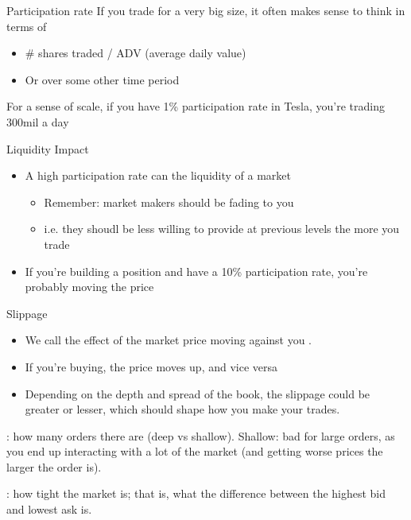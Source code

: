
Participation rate
If you trade for a very big size, it often makes sense to think in terms of 
\begin{itemize}
    \item \# shares traded / ADV (average daily value)
    \item Or over some other time period
\end{itemize}
For a sense of scale, if you have 1\% participation rate in Tesla, you're trading 300mil a day

Liquidity Impact
\begin{itemize}
    \item A high participation rate can  the liquidity of a market
        \begin{itemize}
            \item Remember: market makers should be fading to you
            \item i.e. they shoudl be less willing to provide at previous levels the more you trade
        \end{itemize}
    \item If you're building a position and have a 10\% participation rate, you're probably moving the price
\end{itemize}

Slippage
\begin{itemize}
    \item We call the effect of the market price moving against you .
    \item  If you're buying, the price moves up, and vice versa
    \item Depending on the depth and spread of the book, the slippage could be greater or lesser, which should shape how you make your trades.
\end{itemize}

: how many orders there are (deep vs shallow). Shallow: bad for large orders, as you end up interacting with a lot of the market (and getting worse prices the larger the order is).

: how tight the market is; that is, what the difference between the highest bid and lowest ask is.

